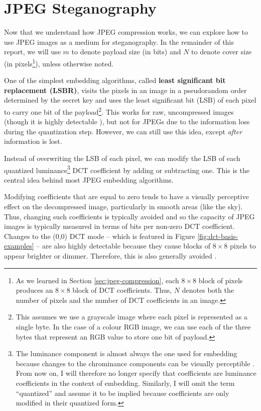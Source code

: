 \documentclass[11pt,a4paper,twoside,openright]{report}
\begin{document}
\section{JPEG Steganography} \label{sec:jpeg-steganography}

Now that we understand how JPEG compression works, we can explore how to use JPEG images as a medium for steganography. In the remainder of this report, we will use $m$ to denote payload size (in bits) and $N$ to denote cover size (in pixels\footnote{As we learned in Section \ref{sec:jpeg-compression}, each $8\times8$ block of pixels produces an $8\times8$ block of DCT coefficients. Thus, $N$ denotes both the number of pixels and the number of DCT coefficients in an image.}), unless otherwise noted.

One of the simplest embedding algorithms, called \textbf{least significant bit replacement (LSBR)}, visits the pixels in an image in a pseudorandom order determined by the secret key and uses the least significant bit (LSB) of each pixel to carry one bit of the payload\footnote{This assumes we use a grayscale image where each pixel is represented as a single byte. In the case of a colour RGB image, we can use each of the three bytes that represent an RGB value to store one bit of payload.}. This works for raw, uncompressed images (though it is highly detectable \cite{ker-notes}), but not for JPEGs due to the information loss during the quantization step. However, we can still use this idea, except \textit{after} information is lost.

Instead of overwriting the LSB of each pixel, we can modify the LSB of each quantized luminance\footnote{The luminance component is almost always the one used for embedding because changes to the chrominance components can be visually perceptible \cite{ker-notes}. From now on, I will therefore no longer specify that coefficients are luminance coefficients in the context of embedding. Similarly, I will omit the term ``quantized'' and assume it to be implied because coefficients are only modified in their quantized form.} DCT coefficient by adding or subtracting one. This is the central idea behind most JPEG embedding algorithms.

Modifying coefficients that are equal to zero tends to have a visually perceptive effect on the decompressed image, particularly in smooth areas (like the sky). Thus, changing such coefficients is typically avoided and so the capacity of JPEG images is typically measured in terms of bits per non-zero DCT coefficient. Changes to the (0,0) DCT mode -- which is featured in Figure \ref{fig:dct-basis-examples} -- are also highly detectable because they cause blocks of $8\times8$ pixels to appear brighter or dimmer. Therefore, this is also generally avoided \cite{ker-notes}.
\end{document}
